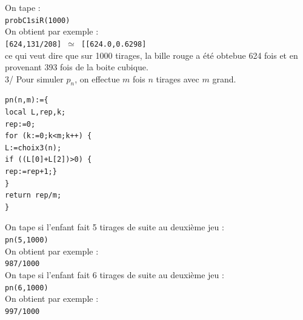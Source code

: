 \documentclass[a4paper,11pt]{book}
\begin{document}
On tape :\\
{\tt probC1siR(1000)}\\
On obtient par exemple :\\
{\tt [624,131/208] $\simeq$ [[624.0,0.6298]}\\
ce qui veut dire que sur 1000 tirages, la bille rouge a \'et\'e obtebue 624 
fois et en provenant 393 fois de la boite cubique.\\
3/ Pour simuler $p_n$, on effectue $m$ fois $n$ tirages avec $m$ grand.
\begin{verbatim}
pn(n,m):={
local L,rep,k;
rep:=0;
for (k:=0;k<m;k++) {
L:=choix3(n);
if ((L[0]+L[2])>0) {
rep:=rep+1;}
}
return rep/m;
}
\end{verbatim}
On tape si l'enfant fait 5 tirages de suite au deuxi\`eme jeu :\\
{\tt pn(5,1000)}\\
On obtient par exemple :\\
{\tt 987/1000}\\
On tape si l'enfant fait 6 tirages de suite au deuxi\`eme jeu :\\
{\tt pn(6,1000)}\\
On obtient par exemple :\\
{\tt 997/1000}
\end{document}
